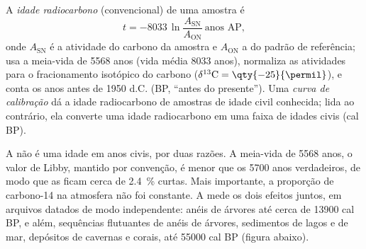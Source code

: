\begin{definition}\label{def:b1:radiometric-methods:radiocarbon}
A \emph{idade radiocarbono} (convencional) de uma amostra é
\[
  t = -8033 \,\ln \frac{A_{\mathrm{SN}}}{A_{\mathrm{ON}}} \ \text{anos AP},
\]
onde $A_{\mathrm{SN}}$ é a atividade do carbono da amostra e $A_{\mathrm{ON}}$ a do padrão de
referência; usa a meia-vida de \num{5568} anos (vida média \num{8033} anos), normaliza as
atividades para o fracionamento isotópico do carbono ($\delta^{13}\mathrm{C} = \qty{-25}{\permil}$),
e conta os anos antes de 1950 d.C. (BP, ``antes do presente''). Uma \emph{curva de
calibração} dá a idade radiocarbono de amostras de idade civil
conhecida; lida ao contrário, ela converte uma idade radiocarbono em uma faixa de idades civis
(cal BP).
\end{definition}

A  não é uma idade em anos civis, por duas razões. A meia-vida de \num{5568}
anos, o valor de Libby, mantido por convenção, é menor que os \num{5700} anos verdadeiros, de
modo que as  ficam cerca de \qty{2.4}{\percent} curtas. Mais importante, a
proporção de carbono-14 na atmosfera não foi constante. A  mede os dois
efeitos juntos, em arquivos datados de modo independente: anéis de árvores até cerca de
\num{13900} cal BP, e além, sequências flutuantes de anéis de árvores, sedimentos de lagos e de
mar, depósitos de cavernas e corais, até \num{55000} cal BP (figura abaixo).

